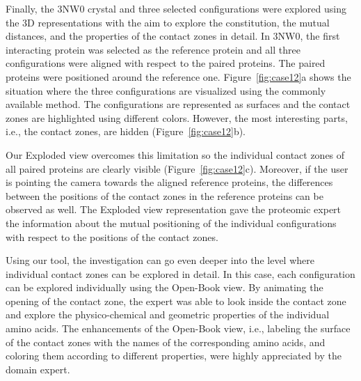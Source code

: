 \documentclass{bmcart}
\def\OpBook {Open-Book view\xspace}
\def\ExpView {Exploded view\xspace}
\begin{document}

Finally, the 3NW0 crystal and three selected configurations were explored using the 3D representations with the aim to explore the constitution, the mutual distances, and the properties of the contact zones in detail.
In 3NW0, the first interacting protein was selected as the reference protein and all three configurations were aligned with respect to the paired proteins.
The paired proteins were positioned around the reference one.
Figure~\ref{fig:case12}a shows the situation where the three configurations are visualized using the commonly available method.
The configurations are represented as surfaces and the contact zones are highlighted using different colors.
However, the most interesting parts, i.e., the contact zones, are hidden (Figure~\ref{fig:case12}b).

Our \ExpView overcomes this limitation so the individual contact zones of all paired proteins are clearly visible (Figure~\ref{fig:case12}c).
Moreover, if the user is pointing the camera towards the aligned reference proteins, the differences between the positions of the contact zones in the reference proteins can be observed as well.
The \ExpView representation gave the proteomic expert the information about the mutual positioning of the individual configurations with respect to the positions of the contact zones.

Using our tool, the investigation can go even deeper into the level where individual contact zones can be explored in detail.
In this case, each configuration can be explored individually using the \OpBook.
By animating the opening of the contact zone, the expert was able to look inside the contact zone and explore the physico-chemical and geometric properties of the individual amino acids.
The enhancements of the \OpBook, i.e., labeling the surface of the contact zones with the names of the corresponding amino acids, and coloring them according to different properties, were highly appreciated by the domain expert.
\end{document}

